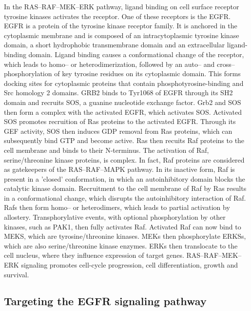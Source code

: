 {{{      In the RAS--RAF--MEK--ERK pathway, ligand binding on cell surface receptor
      tyrosine kinases activates the receptor. One of these receptors is the
      EGFR. EGFR is a protein of the tyrosine kinase receptor family. It is
      anchored in the cytoplasmic membrane and is composed of an
      intracytoplasmic tyrosine kinase domain, a short hydrophobic transmembrane
      domain and an extracellular ligand-binding domain. Ligand binding causes a
      conformational change of the receptor, which leads to homo-- or
      heterodimerization, followed by an auto-- and cross--phosphorylation of
      key tyrosine residues on its cytoplasmic domain. This forms docking sites
      for cytoplasmic proteins that contain phosphotyrosine-binding and Src
      homology 2 domains. GRB2 binds to Tyr1068 of EGFR through its SH2 domain
      and recruits SOS, a guanine nucleotide exchange factor. Grb2 and SOS then
      form a complex with the activated EGFR, which activates SOS. Activated SOS
      promotes recruition of Ras proteins to the activated EGFR. Through its GEF
      activity, SOS then induces GDP removal from Ras proteins, which can
      subsequently bind GTP and become active. Ras then recuits Raf proteins to
      the cell membrane and binds to their N-terminus. The activation of Raf,
      serine/threonine kinase proteins, is complex. In fact, Raf proteins are
      considered as gatekeepers of the RAS--RAF--MAPK pathway. In its inactive
      form, Raf is present in a 'closed' conformation, in which an
      autoinhibitory domain blocks the catalytic kinase domain. Recruitment to
      the cell membrane of Raf by Ras results in a conformational change, which
      disrupts the autoinhibitory interaction of Raf. Rafs then form homo-- or
      heterodimers, which leads to partial activation by allostery.
      Transphorylative events, with optional phosphorylation by other kinases,
      such as PAK1, then fully activates Raf. Activated Raf can now bind to
      MEKS, which are tyrosine/threonine kinases. MEKs then phosphorylate ERKSs,
      which are also serine/threonine kinase enzymes. ERKs then translocate to
      the cell nucleus, where they influence expression of target genes.
      RAS--RAF--MEK--ERK signaling promotes cell-cycle progression, cell
      differentiation, growth and survival.

  \subsection{Targeting the EGFR signaling pathway}

}}}
